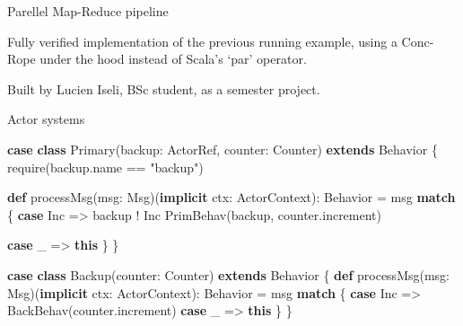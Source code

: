 \documentclass[
  ignorenonframetext,
]{beamer}
\newenvironment{Shaded}{}{}
\newcommand{\FunctionTok}[1]{\textcolor[rgb]{0.02,0.16,0.49}{#1}}
\newcommand{\KeywordTok}[1]{\textcolor[rgb]{0.00,0.44,0.13}{\textbf{#1}}}
\newcommand{\NormalTok}[1]{#1}
\newcommand{\StringTok}[1]{\textcolor[rgb]{0.25,0.44,0.63}{#1}}
\begin{document}
\begin{frame}{Parellel Map-Reduce pipeline}
\protect\hypertarget{parellel-map-reduce-pipeline}{}

Fully verified implementation of the previous running example, using a
Conc-Rope under the hood instead of Scala's `par' operator.

Built by Lucien Iseli, BSc student, as a semester project.

\end{frame}

\begin{frame}[fragile]{Actor systems}
\protect\hypertarget{actor-systems}{}

\begin{Shaded}
\begin{Highlighting}[]
\KeywordTok{case} \KeywordTok{class} \FunctionTok{Primary}\NormalTok{(backup: ActorRef, counter: Counter) }\KeywordTok{extends}\NormalTok{ Behavior \{}
  \FunctionTok{require}\NormalTok{(backup.}\FunctionTok{name}\NormalTok{ == }\StringTok{"backup"}\NormalTok{)}

  \KeywordTok{def} \FunctionTok{processMsg}\NormalTok{(msg: Msg)(}\KeywordTok{implicit}\NormalTok{ ctx: ActorContext): Behavior =}
\NormalTok{    msg }\KeywordTok{match}\NormalTok{ \{}
      \KeywordTok{case}\NormalTok{ Inc =>}
\NormalTok{        backup ! Inc}
        \FunctionTok{PrimBehav}\NormalTok{(backup, counter.}\FunctionTok{increment}\NormalTok{)}

      \KeywordTok{case}\NormalTok{ _ => }\KeywordTok{this}
\NormalTok{    \}}
\NormalTok{\}}
\end{Highlighting}
\end{Shaded}

\end{frame}

\begin{frame}[fragile]

\begin{Shaded}
\begin{Highlighting}[]
\KeywordTok{case} \KeywordTok{class} \FunctionTok{Backup}\NormalTok{(counter: Counter) }\KeywordTok{extends}\NormalTok{ Behavior \{}
  \KeywordTok{def} \FunctionTok{processMsg}\NormalTok{(msg: Msg)(}\KeywordTok{implicit}\NormalTok{ ctx: ActorContext): Behavior = msg }\KeywordTok{match}\NormalTok{ \{}
    \KeywordTok{case}\NormalTok{ Inc => }\FunctionTok{BackBehav}\NormalTok{(counter.}\FunctionTok{increment}\NormalTok{)}
    \KeywordTok{case}\NormalTok{ _ => }\KeywordTok{this}
\NormalTok{  \}}
\NormalTok{\}}
\end{Highlighting}
\end{Shaded}

\end{frame}
\end{document}
